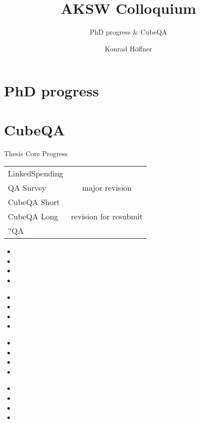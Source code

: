 \documentclass[14pt]{beamer}
\author{Konrad Höffner}
\title{AKSW Colloquium}
\subtitle{PhD progress \& CubeQA}
\begin{document}
\begin{frame}
\titlepage
\end{frame}

\section{PhD progress}
\section{CubeQA}

\begin{frame}{Thesis Core Progress}
\begin{tabular}{lc}
LinkedSpending	&\checkmark\\
QA Survey	&major revision\\
CubeQA Short	&\checkmark\\
CubeQA Long	&revision for resubmit\\
?QA		&\\
\end{tabular}
\end{frame}

\begin{frame}{}
\begin{itemize}
\item 
\item 
\item 
\item 
\end{itemize}
\end{frame}

\begin{frame}{}
\begin{itemize}
\item 
\item 
\item 
\item 
\end{itemize}
\end{frame}

\begin{frame}{}
\begin{itemize}
\item 
\item 
\item 
\item 
\end{itemize}
\end{frame}

\begin{frame}{}
\begin{itemize}
\item 
\item 
\item 
\item 
\end{itemize}
\end{frame}
\end{document}
